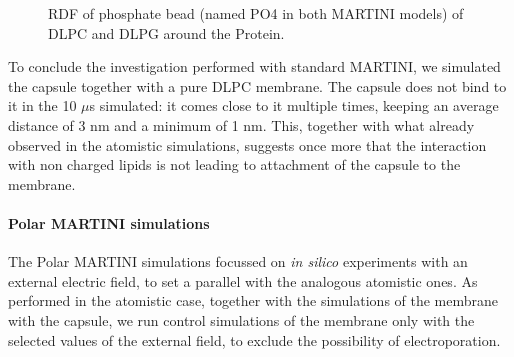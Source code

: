 \begin{figure}[t!]
\centering
{}
\caption[Proximity of lipids phosphate to bound capsule]{RDF of phosphate bead (named PO4 in both MARTINI models) of DLPC and DLPG around the Protein.}
\label{fig:PO4_RDF_dens}
\end{figure}

To conclude the investigation performed with standard MARTINI, we simulated the capsule together with a pure DLPC membrane. The capsule does not bind to it in the 10 $\mu$s simulated: it comes close to it multiple times, keeping an average distance of 3 nm and a minimum of 1 nm. This, together with what already observed in the atomistic simulations, suggests once more that the interaction with non charged lipids is not leading to attachment of the capsule to the membrane.

\paragraph{Polar MARTINI simulations} 
The Polar MARTINI simulations focussed on \emph{in silico} experiments with an external electric field, to set a parallel with the analogous atomistic ones.
%
As performed in the atomistic case, together with the simulations of the membrane with the capsule, we run control simulations of the membrane only with the selected values of the external field, to exclude the possibility of electroporation.

